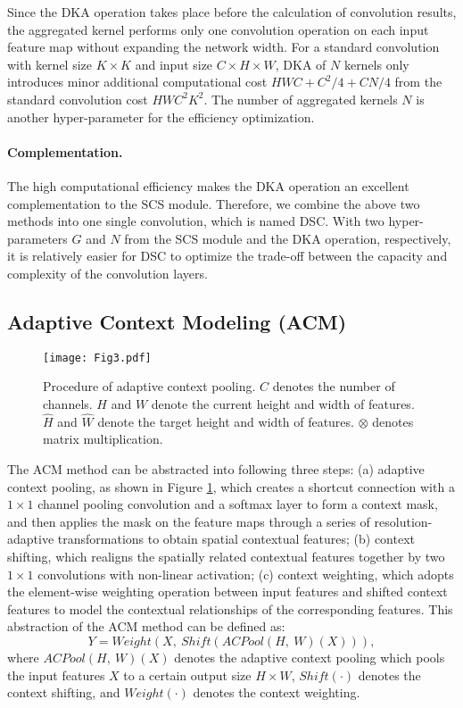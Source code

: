 \documentclass{article}
\begin{document}
Since the DKA operation takes place before the calculation of convolution results, the aggregated kernel performs only one convolution operation on each input feature map without expanding the network width. For a standard convolution with kernel size $K \times K$ and input size $C \times H \times W$, DKA of $N$ kernels only introduces minor additional computational cost $HWC + C^2/4 + CN/4$ from the standard convolution cost $HWC^2K^2$. The number of aggregated kernels $N$ is another hyper-parameter for the efficiency optimization.

\paragraph{Complementation.} The high computational efficiency makes the DKA operation an excellent complementation to the SCS module. Therefore, we combine the above two methods into one single convolution, which is named DSC. With two hyper-parameters $G$ and $N$ from the SCS module and the DKA operation, respectively, it is relatively easier for DSC to optimize the trade-off between the capacity and complexity of the convolution layers.

\subsection{Adaptive Context Modeling (ACM)}

\begin{figure}[t]
\centering
\texttt{[image: Fig3.pdf]}
\caption{Procedure of adaptive context pooling. $C$ denotes the number of channels. $H$ and $W$ denote the current height and width of features. $\widehat{H}$ and $\widehat{W}$ denote the target height and width of features. $\otimes$ denotes matrix multiplication.}
\label{fig3}
\end{figure}

The ACM method can be abstracted into following three steps: (a) adaptive context pooling, as shown in Figure \ref{fig3}, which creates a shortcut connection with a $1 \times 1$ channel pooling convolution and a softmax layer to form a context mask, and then applies the mask on the feature maps through a series of resolution-adaptive transformations to obtain spatial contextual features; (b) context shifting, which realigns the spatially related contextual features together by two $1 \times 1$ convolutions with non-linear activation; (c) context weighting, which adopts the element-wise weighting operation between input features and shifted context features to model the contextual relationships of the corresponding features. This abstraction of the ACM method can be defined as:
\begin{equation}
    Y = Weight(X, \ Shift(ACPool(H, \ W)(X))),
\end{equation}where $ACPool(H, \ W)(X)$ denotes the adaptive context pooling which pools the input features $X$ to a certain output size $H \times W$, $Shift(\cdot)$ denotes the context shifting, and $Weight(\cdot)$ denotes the context weighting.
\end{document}

